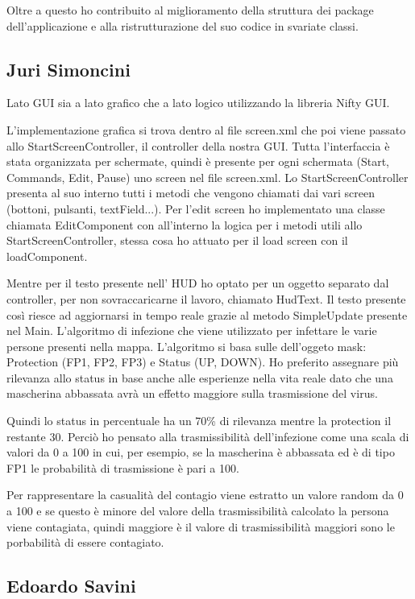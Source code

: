 Oltre a questo ho contribuito al miglioramento della struttura dei package dell'applicazione e alla ristrutturazione del suo codice in svariate classi.

\subsection{Juri Simoncini}
Lato GUI sia a lato grafico che a lato logico utilizzando la libreria Nifty GUI.

L'implementazione grafica si trova dentro al file screen.xml che poi viene passato allo StartScreenController, il controller della nostra GUI.
Tutta l'interfaccia è stata organizzata per schermate, quindi è presente per ogni schermata (Start, Commands, Edit, Pause) uno screen nel file screen.xml.
Lo StartScreenController presenta al suo interno tutti i metodi che vengono chiamati dai vari screen (bottoni, pulsanti, textField...).
Per l'edit screen ho implementato una classe chiamata EditComponent con all'interno la logica per i metodi utili allo StartScreenController, stessa cosa ho attuato per il load screen con il loadComponent.

Mentre per il testo presente nell' HUD ho optato per un oggetto separato dal controller, per non sovraccaricarne il lavoro, chiamato HudText.
Il testo presente così riesce ad aggiornarsi in tempo reale grazie al metodo SimpleUpdate presente nel Main.
L'algoritmo di infezione che viene utilizzato per infettare le varie persone presenti nella mappa.
L'algoritmo si basa sulle dell'oggeto mask: Protection (FP1, FP2, FP3) e Status (UP, DOWN).
Ho preferito assegnare più rilevanza allo status in base anche alle esperienze nella vita reale dato che una mascherina abbassata avrà un effetto maggiore sulla trasmissione del virus.

Quindi lo status in percentuale ha un 70\% di rilevanza mentre la protection il restante 30.
Perciò ho pensato alla trasmissibilità dell'infezione come una scala di valori da 0 a 100 in cui, per esempio, se la mascherina è abbassata ed è di tipo FP1 le probabilità di trasmissione è pari a 100.

Per rappresentare la casualità del contagio viene estratto un valore random da 0 a 100 e se questo è minore del valore della trasmissibilità calcolato la persona viene contagiata, quindi maggiore è il valore di trasmissibilità maggiori sono le porbabilità di essere contagiato.

\subsection{Edoardo Savini}

